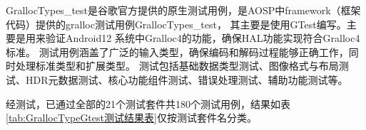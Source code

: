 GrallocTypes\_test是谷歌官方提供的原生测试用例，是AOSP中framework（框架代码）提供的gralloc测试用例GrallocTypes\_test，
其主要是使用GTest编写。主要是用来验证Android12 系统中Gralloc4的功能，确保HAL功能实现符合Gralloc4标准。
测试用例涵盖了广泛的输入类型，确保编码和解码过程能够正确工作，同时处理标准类型和扩展类型。
测试包括基础数据类型测试、图像格式与布局测试、HDR元数据测试、核心功能组件测试、错误处理测试、辅助功能测试等。




    



经测试，已通过全部的21个测试套件共180个测试用例，结果如表\ref{tab:GrallocTypeGtest测试结果表}仅按测试套件名分类。

